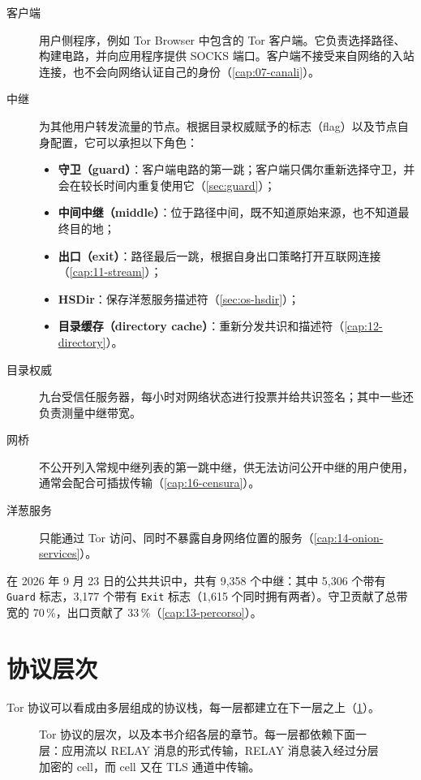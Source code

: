 \begin{description}
  \item[客户端] 用户侧程序，例如 Tor Browser 中包含的 Tor 客户端。它负责选择路径、构建电路，并向应用程序提供 SOCKS 端口。客户端不接受来自网络的入站连接，也不会向网络认证自己的身份（\cref{cap:07-canali}）。
  \item[中继] 为其他用户转发流量的节点。根据目录权威赋予的标志（flag）以及节点自身配置，它可以承担以下角色：
  \begin{itemize}
    \item \textbf{守卫（guard）}：客户端电路的第一跳；客户端只偶尔重新选择守卫，并会在较长时间内重复使用它（\cref{sec:guard}）；
    \item \textbf{中间中继（middle）}：位于路径中间，既不知道原始来源，也不知道最终目的地；
    \item \textbf{出口（exit）}：路径最后一跳，根据自身出口策略打开互联网连接（\cref{cap:11-stream}）；
    \item \textbf{HSDir}：保存洋葱服务描述符（\cref{sec:os-hsdir}）；
    \item \textbf{目录缓存（directory cache）}：重新分发共识和描述符（\cref{cap:12-directory}）。
  \end{itemize}
  \item[目录权威] 九台受信任服务器，每小时对网络状态进行投票并给共识签名；其中一些还负责测量中继带宽。
  \item[网桥] 不公开列入常规中继列表的第一跳中继，供无法访问公开中继的用户使用，通常会配合可插拔传输（\cref{cap:16-censura}）。
  \item[洋葱服务] 只能通过 Tor 访问、同时不暴露自身网络位置的服务（\cref{cap:14-onion-services}）。
\end{description}

在 2026 年 9 月 23 日的公共共识中，共有 9,358 个中继：其中 5,306 个带有 \texttt{Guard} 标志，3,177 个带有 \texttt{Exit} 标志（1,615 个同时拥有两者）。守卫贡献了总带宽的 70\,\%，出口贡献了 33\,\%（\cref{cap:13-percorso}）。

\section{协议层次}\label{sec:arch-livelli}

Tor 协议可以看成由多层组成的协议栈，每一层都建立在下一层之上（\cref{fig:arch-livelli}）。

\begin{figure}[htbp]
\centering

\caption{Tor 协议的层次，以及本书介绍各层的章节。每一层都依赖下面一层：应用流以 RELAY 消息的形式传输，RELAY 消息装入经过分层加密的 cell，而 cell 又在 TLS 通道中传输。}
\label{fig:arch-livelli}
\end{figure}

